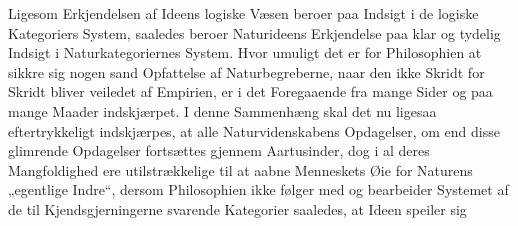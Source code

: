 \documentclass[12pt,a4paper]{book}
\begin{document}
Ligesom Erkjendelsen af Ideens logiske Væsen beroer paa Indsigt i de
logiske Kategoriers System, saaledes beroer Naturideens Erkjendelse paa
klar og tydelig Indsigt i Naturkategoriernes System. Hvor umuligt det er
for Philosophien at sikkre sig nogen sand Opfattelse af Naturbegreberne,
naar den ikke Skridt for Skridt bliver veiledet af Empirien, er i det
Foregaaende fra mange Sider og paa mange Maader indskjærpet. I denne
Sammenhæng skal det nu ligesaa eftertrykkeligt indskjærpes, at alle
Naturvidenskabens Opdagelser, om end disse glimrende Opdagelser
fortsættes gjennem Aartusinder, dog i al deres Mangfoldighed ere
utilstrækkelige til
\setcounter{footnote}{0}
at aabne Menneskets Øie for Naturens „egentlige Indre“, dersom
Philosophien ikke følger med og bearbeider Systemet af de til
Kjendsgjerningerne svarende Kategorier saaledes, at Ideen speiler sig
\end{document}
